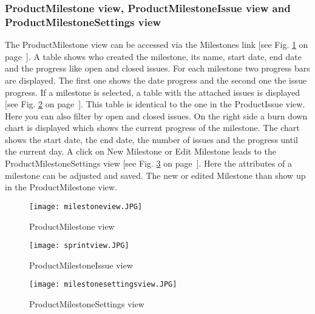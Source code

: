     \subsubsection*{ProductMilestone view, ProductMilestoneIssue view and ProductMilestoneSettings view}
    The ProductMilestone view can be accessed via the Milestones link [see Fig. \ref{fig: milestoneview} on page~\pageref{fig: milestoneview}]. A table shows who created the milestone, its name, start date, end date and the progress like open and closed issues. For each milestone two progress bars are displayed. The first one shows the date progress and the second one the issue progress. If a milestone is selected, a table with the attached issues is displayed [see Fig. \ref{fig: sprintview} on page~\pageref{fig: sprintview}]. This table is identical to the one in the ProductIssue view. Here you can also filter by open and closed issues. On the right side a burn down chart is displayed which shows the current progress of the milestone. The chart shows the start date, the end date, the number of issues and the progress until the current day. A click on New Milestone or Edit Milestone leads to the ProductMilestoneSettings view [see Fig. \ref{fig: milestonesettingsview} on page~\pageref{fig: milestonesettingsview}]. Here the attributes of a milestone can be adjusted and saved. The new or edited Milestone than show up in the ProductMilestone view.

    \begin{figure}[h]
        \centering
        \texttt{[image: milestoneview.JPG]}
        \caption{ProductMilestone view}
        \label{fig: milestoneview}
    \end{figure}

    \begin{figure}[h]
        \centering
        \texttt{[image: sprintview.JPG]}
        \caption{ProductMilestoneIssue view}
        \label{fig: sprintview}
    \end{figure}

    \begin{figure}[h]
        \centering
        \texttt{[image: milestonesettingsview.JPG]}
        \caption{ProductMilestoneSettings view}
        \label{fig: milestonesettingsview}
    \end{figure}


